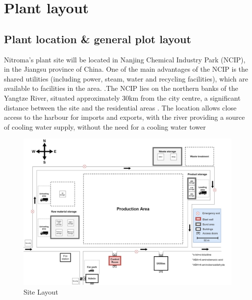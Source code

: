 \section{Plant layout}

\subsection{Plant location \& general plot layout}

Nitroma’s plant site will be located in Nanjing Chemical Industry Park (NCIP), in the Jiangsu province of China. One of the main advantages of the NCIP is the shared utilities (including power, steam, water and recycling facilities), which are available to facilities in the area. \cite{independent_commodity_intelligence_services_china_2007}.The NCIP lies on the northern banks of the Yangtze River, situated approximately 30km from the city centre, a significant distance between the site and the residential areas \cite{zeng_divergent_2011}. The location allows close access to the harbour for imports and exports, with the river providing a source of cooling water supply, without the need for a cooling water tower

\begin{figure}
\centering
\includegraphics[width=\linewidth]{chapters/5-safety-layout-environment/figures/Plant layout.jpg}
\caption{Site Layout}
\label{fig:site}
\end{figure}

